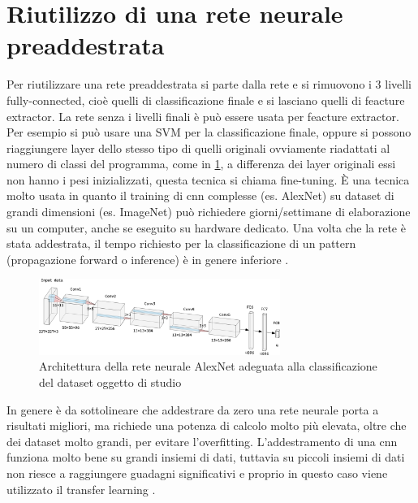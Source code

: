 \section{Riutilizzo di una rete neurale preaddestrata}\label{riutilizzo-di-una-rete-neurale-preaddestrata}

Per riutilizzare una rete preaddestrata si parte dalla rete e si rimuovono i 3 livelli \gls{fully-connected}, cioè quelli di classificazione finale e si lasciano quelli di feacture extractor. La rete senza i livelli finali è può essere usata per feacture extractor. Per esempio si può usare una SVM per la classificazione finale, oppure si possono riaggiungere layer dello stesso tipo di quelli originali ovviamente riadattati al numero di classi del programma, come in \cref{fig:alexnet-tl}, a differenza dei layer originali essi non hanno i pesi inizializzati, questa tecnica si chiama fine-tuning. È una tecnica molto usata in quanto il training di \gls{cnn} complesse (es. AlexNet) su dataset di grandi dimensioni (es. ImageNet) può richiedere giorni/settimane di elaborazione su un computer, anche se eseguito su hardware dedicato. Una volta che la rete è stata addestrata, il tempo richiesto per la classificazione di un  pattern (\gls{propagazione forward} o inference) è in genere inferiore \cite{yosinski_tl} \cite{unibo_maltoni_ml}.

\begin{figure}[ht]
    \centering
    \includegraphics[width=0.7\textwidth]{addestramento-rete-neurale/alexnet-tl.pdf}
    \caption{Architettura della rete neurale AlexNet adeguata alla classificazione del dataset oggetto di studio}
    \label{fig:alexnet-tl}
\end{figure}

In genere è da sottolineare che addestrare da zero una rete neurale porta a risultati migliori, ma richiede una potenza di calcolo molto più  elevata, oltre che dei dataset molto grandi, per evitare l'\gls{overfitting}. L'addestramento di una \gls{cnn} funziona molto bene su grandi insiemi di dati, tuttavia su piccoli insiemi di dati non riesce a raggiungere guadagni significativi e proprio in questo caso viene utilizzato il transfer learning \cite{joel_tl}.

